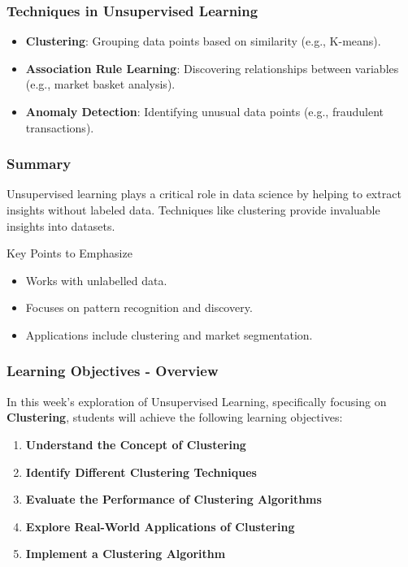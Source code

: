 \documentclass[aspectratio=169]{beamer}
\begin{document}
\begin{frame}[fragile]
    \frametitle{Techniques in Unsupervised Learning}
    \begin{itemize}
        \item \textbf{Clustering}: Grouping data points based on similarity (e.g., K-means).
        \item \textbf{Association Rule Learning}: Discovering relationships between variables (e.g., market basket analysis).
        \item \textbf{Anomaly Detection}: Identifying unusual data points (e.g., fraudulent transactions).
    \end{itemize}
\end{frame}

\begin{frame}[fragile]
    \frametitle{Summary}
    Unsupervised learning plays a critical role in data science by helping to extract insights without labeled data. Techniques like clustering provide invaluable insights into datasets.

    \begin{block}{Key Points to Emphasize}
        \begin{itemize}
            \item Works with unlabelled data.
            \item Focuses on pattern recognition and discovery.
            \item Applications include clustering and market segmentation.
        \end{itemize}
    \end{block}
\end{frame}

\begin{frame}[fragile]
    \frametitle{Learning Objectives - Overview}
    In this week's exploration of Unsupervised Learning, specifically focusing on \textbf{Clustering}, students will achieve the following learning objectives:
    
    \begin{enumerate}
        \item \textbf{Understand the Concept of Clustering}
        \item \textbf{Identify Different Clustering Techniques}
        \item \textbf{Evaluate the Performance of Clustering Algorithms}
        \item \textbf{Explore Real-World Applications of Clustering}
        \item \textbf{Implement a Clustering Algorithm}
    \end{enumerate}
\end{frame}
\end{document}
